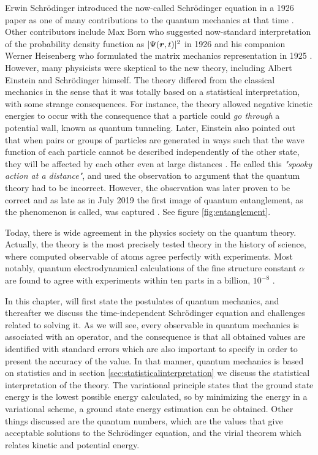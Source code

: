 Erwin Schrödinger introduced the now-called Schrödinger equation in a 1926 paper as one of many contributions to the quantum mechanics at that time \cite{schrodinger_undulatory_1926}. Other contributors include Max Born who suggested now-standard interpretation of the probability density function as $|\Psi(\boldsymbol{{r}},t)|^2$ in 1926 \cite{born_zur_1926} and his companion Werner Heisenberg who formulated the matrix mechanics representation in 1925 \cite{heisenberg_uber_1925}. However, many physicists were skeptical to the new theory, including Albert Einstein and Schrödinger himself. The theory differed from the classical mechanics in the sense that it was totally based on a statistical interpretation, with some strange consequences. For instance, the theory allowed negative kinetic energies to occur with the consequence that a particle could \textit{go through} a potential wall, known as quantum tunneling. Later, Einstein also pointed out that when pairs or groups of particles are generated in ways such that the wave function of each particle cannot be described independently of the other state, they will be affected by each other even at large distances \cite{einstein_can_1935}. He called this \textit{"spooky action at a distance"}, and used the observation to argument that the quantum theory had to be incorrect. However, the observation was later proven to be correct and as late as in July 2019 the first image of quantum entanglement, as the phenomenon is called, was captured \cite{moreau_imaging_2019}. See figure \eqref{fig:entanglement}.

Today, there is wide agreement in the physics society on the quantum theory. Actually, the theory is the most precisely tested theory in the history of science, where computed observable of atoms agree perfectly with experiments. Most notably, quantum electrodynamical calculations of the fine structure constant $\alpha$ are found to agree with experiments within ten parts in a billion, $10^{-8}$ \cite{noauthor_most_nodate}.\bigskip

In this chapter, will first state the postulates of quantum mechanics, and thereafter we discuss the time-independent Schrödinger equation and challenges related to solving it. As we will see, every observable in quantum mechanics is associated with an operator, and the consequence is that all obtained values are identified with standard errors which are also important to specify in order to present the accuracy of the value. In that manner, quantum mechanics is based on statistics and in section \eqref{sec:statisticalinterpretation} we discuss the statistical interpretation of the theory. The variational principle states that the ground state energy is the lowest possible energy calculated, so by minimizing the energy in a variational scheme, a ground state energy estimation can be obtained. Other things discussed are the quantum numbers, which are the values that give acceptable solutions to the Schrödinger equation, and the virial theorem which relates kinetic and potential energy. 

